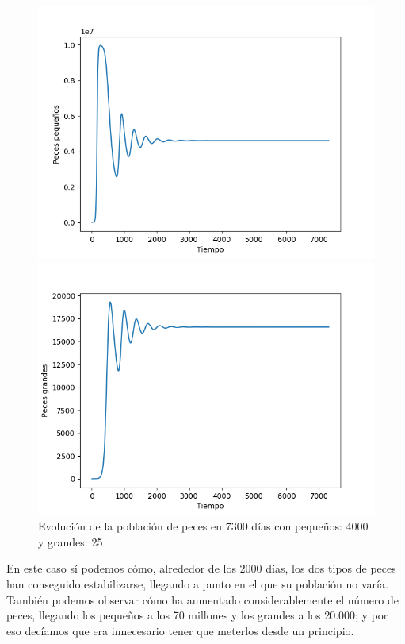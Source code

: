 \documentclass[11pt,a4paper]{report}
\begin{document}
\begin{figure}[H]
	\begin{minipage}{0.5\textwidth}
	  \centering
	  \includegraphics[scale=0.45]{img/pequenios-4000-25.png}
	\end{minipage}
	\begin{minipage}{0.5\textwidth}
	  \centering
	  \includegraphics[scale=0.45]{img/grandes-4000-25.png}
	\end{minipage}
	\caption{Evolución de la población de peces en 7300 días con pequeños: 4000 y grandes: 25}
\end{figure}

En este caso sí podemos cómo, alrededor de los 2000 días, los dos tipos de peces han conseguido estabilizarse, llegando a punto en el que su
población no varía. También podemos observar cómo ha aumentado considerablemente el número de peces, llegando los pequeños a los 70 millones
y los grandes a los 20.000; y por eso decíamos que era innecesario tener que meterlos desde un principio.
\end{document}
